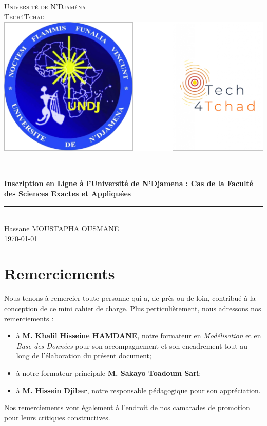\documentclass[12pt,a4paper]{article}
\begin{document}
	\begin{titlepage}
		\newcommand{\HRule}{\rule{\linewidth}{0.5mm}}
		\center
		\textsc{\LARGE
			Université de N'Djamèna \\[0.5cm] Tech4Tchad
		} \\[1cm]
		\includegraphics[scale=0.5]{logo.png} \\[1cm]
		\HRule \\[0.15cm]
		{ \huge \bfseries Inscription en Ligne à l'Université de N'Djamena : Cas de la Faculté des Sciences Exactes et Appliquées \\[0.15cm] }
		\HRule \\[1.5cm]
		Hassane MOUSTAPHA OUSMANE
		\\[1cm]
		\today \\ [1cm]
	\end{titlepage}

	\tableofcontents
	\thispagestyle{empty} 
	
	\newpage
	\section*{Remerciements}
	Nous tenons à remercier toute personne qui a, de près ou de loin, contribué à la conception de ce mini cahier de charge. Plus perticulièrement, nous adressons nos remerciements :
	\begin{itemize}
		\item à \textbf{M. Khalil Hisseine HAMDANE}, notre formateur en \emph{Modélisation} et en \emph{Base des Données} pour son accompagnement et son encadrement tout au long de l'élaboration du présent document;
		\item à notre formateur principale \textbf{M. Sakayo Toadoum Sari};
		\item à \textbf{M. Hissein Djiber}, notre responsable pédagogique pour son appréciation.
	\end{itemize}
	Nos remerciements vont également à l’endroit de nos camarades de promotion pour leurs critiques constructives.
	
\end{document}
